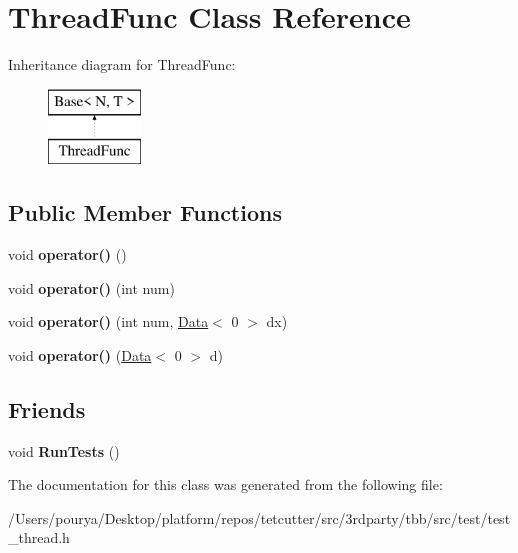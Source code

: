 \hypertarget{classThreadFunc}{}\section{Thread\+Func Class Reference}
\label{classThreadFunc}
Inheritance diagram for Thread\+Func\+:\begin{figure}[H]
\begin{center}
\leavevmode
\includegraphics[height=2.000000cm]{classThreadFunc}
\end{center}
\end{figure}
\subsection*{Public Member Functions}
\begin{DoxyCompactItemize}
\item 
\hypertarget{classThreadFunc_a33a713dd5adc541f912a8c2744950779}{}void {\bfseries operator()} ()\label{classThreadFunc_a33a713dd5adc541f912a8c2744950779}

\item 
\hypertarget{classThreadFunc_a695e6e70f9daf28e5dcccaa1c7aa5ed9}{}void {\bfseries operator()} (int num)\label{classThreadFunc_a695e6e70f9daf28e5dcccaa1c7aa5ed9}

\item 
\hypertarget{classThreadFunc_af45697125575865adf418ed83250bb9b}{}void {\bfseries operator()} (int num, \hyperlink{classData}{Data}$<$ 0 $>$ dx)\label{classThreadFunc_af45697125575865adf418ed83250bb9b}

\item 
\hypertarget{classThreadFunc_aca55ad697a82938d7f1df2dffca2a189}{}void {\bfseries operator()} (\hyperlink{classData}{Data}$<$ 0 $>$ d)\label{classThreadFunc_aca55ad697a82938d7f1df2dffca2a189}

\end{DoxyCompactItemize}
\subsection*{Friends}
\begin{DoxyCompactItemize}
\item 
\hypertarget{classThreadFunc_a42dac6ca34e006a4c6eccfd7842df376}{}void {\bfseries Run\+Tests} ()\label{classThreadFunc_a42dac6ca34e006a4c6eccfd7842df376}

\end{DoxyCompactItemize}


The documentation for this class was generated from the following file\+:\begin{DoxyCompactItemize}
\item 
/\+Users/pourya/\+Desktop/platform/repos/tetcutter/src/3rdparty/tbb/src/test/test\+\_\+thread.\+h\end{DoxyCompactItemize}
